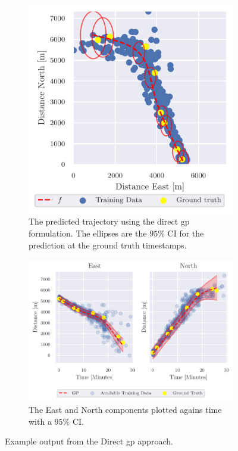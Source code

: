 \begin{figure}
    \centering
    \begin{subfigure}{\textwidth}
        \centering
        \includegraphics{figures/direct_gp_example.pdf}
        \caption{The predicted trajectory using the direct \acrshort{gp} formulation. The ellipses are the $95\%$ CI for the prediction at the ground truth timestamps.}
    \end{subfigure}
        \begin{subfigure}{\textwidth}
        \centering
        \includegraphics{figures/direct_gp_state_example.pdf}
        \caption{The East and North components plotted agains time with a $95\%$ CI.}
    \end{subfigure}
    \caption{Example output from the Direct \acrshort{gp} approach. }
\end{figure}